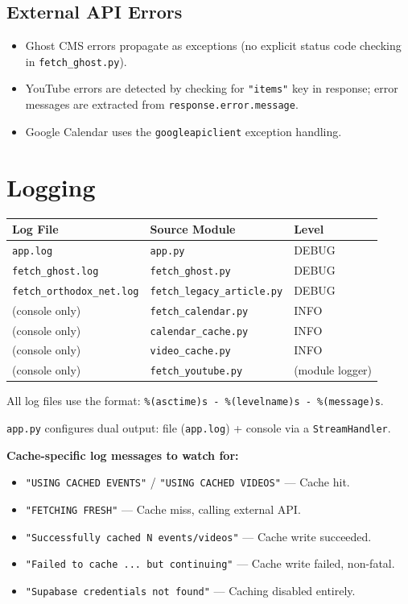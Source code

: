 \documentclass[12pt]{article}
\begin{document}
\subsection{External API Errors}
\begin{itemize}
    \item Ghost CMS errors propagate as exceptions (no explicit status code checking in \texttt{fetch\_ghost.py}).
    \item YouTube errors are detected by checking for \texttt{"items"} key in response; error messages are extracted from \texttt{response.error.message}.
    \item Google Calendar uses the \texttt{googleapiclient} exception handling.
\end{itemize}

\section{Logging}

\begin{longtable}{lll}
\toprule
\textbf{Log File} & \textbf{Source Module} & \textbf{Level} \\
\midrule
\texttt{app.log} & \texttt{app.py} & DEBUG \\
\texttt{fetch\_ghost.log} & \texttt{fetch\_ghost.py} & DEBUG \\
\texttt{fetch\_orthodox\_net.log} & \texttt{fetch\_legacy\_article.py} & DEBUG \\
(console only) & \texttt{fetch\_calendar.py} & INFO \\
(console only) & \texttt{calendar\_cache.py} & INFO \\
(console only) & \texttt{video\_cache.py} & INFO \\
(console only) & \texttt{fetch\_youtube.py} & (module logger) \\
\bottomrule
\end{longtable}

All log files use the format: \texttt{\%(asctime)s - \%(levelname)s - \%(message)s}.

\texttt{app.py} configures dual output: file (\texttt{app.log}) + console via a \texttt{StreamHandler}.

\textbf{Cache-specific log messages to watch for:}
\begin{itemize}
    \item \texttt{"USING CACHED EVENTS"} / \texttt{"USING CACHED VIDEOS"} --- Cache hit.
    \item \texttt{"FETCHING FRESH"} --- Cache miss, calling external API.
    \item \texttt{"Successfully cached N events/videos"} --- Cache write succeeded.
    \item \texttt{"Failed to cache ... but continuing"} --- Cache write failed, non-fatal.
    \item \texttt{"Supabase credentials not found"} --- Caching disabled entirely.
\end{itemize}
\end{document}
